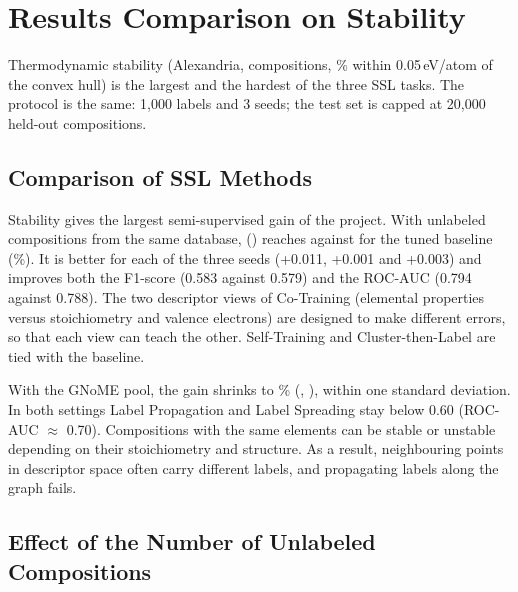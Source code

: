 \clearpage
\section{Results Comparison on Stability}

Thermodynamic stability (Alexandria, \StabN{} compositions, \StabPos{}\% within
0.05\,eV/atom of the convex hull) is the largest and the hardest of the three SSL tasks. The
protocol is the same: 1,000 labels and 3 seeds; the test set is capped at 20,000 held-out
compositions.

\subsection*{Comparison of SSL Methods}



Stability gives the largest semi-supervised gain of the project. With unlabeled compositions
from the same database, \StabInBestMethod{} (\texttt{\StabInBestConfig}) reaches
\StabInBestComp{} against \StabInBaseComp{} for the tuned \StabInBaseConfig{} baseline
(\StabInImpr\%). It is better for each of the three seeds (+0.011, +0.001 and +0.003) and
improves both the F1-score (0.583 against 0.579) and the ROC-AUC (0.794 against 0.788). The
two descriptor views of Co-Training (elemental properties versus stoichiometry and valence
electrons) are designed to make different errors, so that each view can teach the other. Self-Training and
Cluster-then-Label are tied with the baseline.

With the GNoME pool, the gain shrinks to \StabGnImpr\% (\StabGnBestMethod{},
\StabGnBestComp{}), within one standard deviation. In both settings Label Propagation and Label
Spreading stay below 0.60 (ROC-AUC $\approx$ 0.70). Compositions with the same elements can be
stable or unstable depending on their stoichiometry and structure. As a result, neighbouring
points in descriptor space often carry different labels, and propagating labels along the
graph fails.

\subsection*{Effect of the Number of Unlabeled Compositions}

